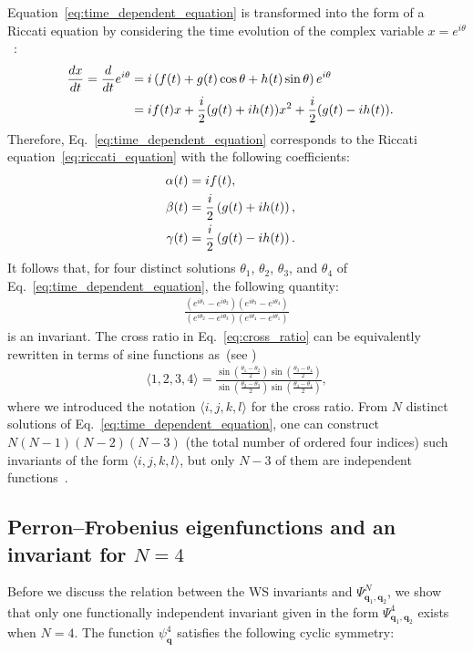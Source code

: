 \documentclass[
amsmath,amssymb,
]{revtex4-2}
\begin{document}
Equation~\eqref{eq:time_dependent_equation} is transformed into the form of a Riccati equation by considering the time evolution of the complex variable $x = e^{i\theta}$~\cite{Watanabe1994constants,Marvel2009identical}:
\begin{align}
    \frac{dx}{dt} = \frac{d}{dt}e^{i\theta} &= i\left(f(t) + g(t)\cos \theta + h(t)\sin \theta \right)e^{i\theta} \cr
    &=if(t)x + \frac{i}{2}(g(t)+ih(t))x^2 + \frac{i}{2}(g(t)-ih(t)).
\end{align}
% 
Therefore, Eq.~\eqref{eq:time_dependent_equation} corresponds to the Riccati equation~\eqref{eq:riccati_equation} with the following coefficients:
\begin{align}
    \alpha(t) &= i f(t),\cr
    \beta(t) &= \frac{i}{2}\left(g(t) + i h(t)\right),\cr
    \gamma(t) &= \frac{i}{2}\left(g(t) - i h(t)\right).
\end{align}
% 
It follows that, for four distinct solutions $\theta_1$, $\theta_2$, $\theta_3$, and $\theta_4$ of Eq.~\eqref{eq:time_dependent_equation}, the following quantity:
\begin{align}
    \frac{(e^{i\theta_1} - e^{i\theta_2})(e^{i\theta_3} - e^{i\theta_4})}{(e^{i\theta_2} - e^{i\theta_3})(e^{i\theta_4} - e^{i\theta_1})}
\end{align}
is an invariant. The cross ratio in Eq.~\eqref{eq:cross_ratio} can be equivalently rewritten in terms of sine functions as~(see \cite{Marvel2009identical})
\begin{align}
\label{eq:bracket}
    \langle 1,2,3,4\rangle = \frac{\sin\left(\frac{\theta_1 - \theta_2}{2}\right) \sin\left(\frac{\theta_3 - \theta_4}{2}\right)}{\sin\left(\frac{\theta_2 - \theta_3}{2}\right) \sin\left(\frac{\theta_4 - \theta_1}{2}\right)},
\end{align}
where we introduced the notation $\langle i,j,k,l\rangle$ for the cross ratio.
From $N$ distinct solutions of Eq.~\eqref{eq:time_dependent_equation}, one can construct $N(N-1)(N-2)(N-3)$ (the total number of ordered four indices) such invariants of the form $\langle i,j,k,l\rangle$, but only $N - 3$ of them are independent functions~\cite{Marvel2009identical}. 

\subsection{Perron--Frobenius eigenfunctions and an invariant for $N=4$}
\label{sec:independent}

Before we discuss the relation between the WS invariants and $\Psi^N_{\bm{q}_1, \bm{q}_2}$, we show that only one functionally independent invariant given in the form $\Psi^4_{\bm{q}_1,\bm{q}_2}$ exists when $N=4$. 
%
The function $\psi^4_{\bm{q}}$ satisfies the following cyclic symmetry:
\end{document}
